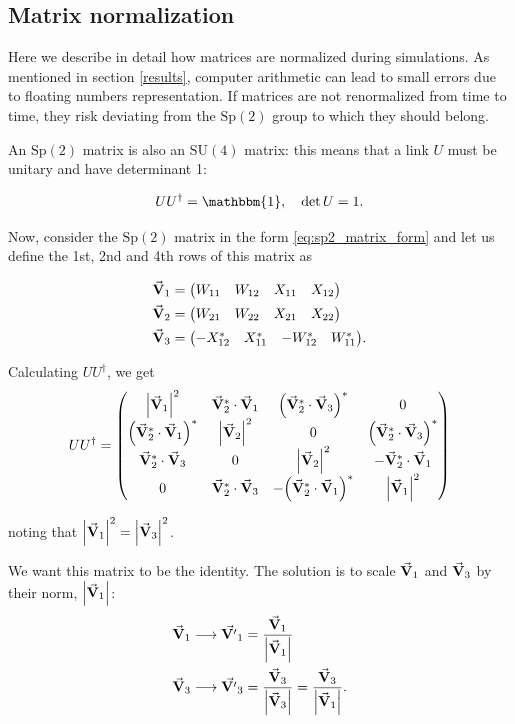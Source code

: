 \documentclass[reqno,12pt]{article}
\numberwithin{equation}{section}
\newcommand{\SU}{\mathrm{SU}}
\newcommand{\Sp}{\mathrm{Sp}}
\newcommand{\id}{\mathbbm{1}}
\begin{document}
\begin{appendices}
\section{Matrix normalization} \label{normalization}
	
Here we describe in detail how matrices are normalized during simulations. As mentioned in section \ref{results},
computer arithmetic can lead to small errors due to floating numbers representation. If matrices are not renormalized
from time to time, they risk deviating from the $\Sp(2)$ group to which they should belong. 

An $\Sp(2)$ matrix is also an $\SU(4)$ matrix: this means that a link $U$ must be unitary and have determinant 1:

\begin{equation}
	UU^\dagger = \id \qc \det U = 1.
\end{equation}	

Now, consider the $\Sp(2)$ matrix in the form \eqref{eq:sp2_matrix_form}
 and let us define the 1st, 2nd and 4th rows of this matrix as

\begin{equation}	
	\begin{aligned}
		\va{V}_1 &= \mqty(W_{11} & W_{12} & X_{11} & X_{12}) \\
		\va{V}_2 &= \mqty(W_{21} & W_{22} & X_{21} & X_{22}) \\
		\va{V}_3 &= \mqty(-X_{12}^* & X_{11}^* & -W_{12}^* & W_{11}^*).
	\end{aligned}
\end{equation}

Calculating $UU^\dagger$, we get
\begin{equation}
	UU^\dagger = 
	\mqty(
		\abs{\va{V}_1}^2 & \va{V}_2^*\cdot\va{V}_1 & \qty(\va{V}_2^*\cdot\va{V}_3)^* & 0 \\
		\qty(\va{V}_2^*\cdot\va{V}_1)^* & \abs{\va{V}_2}^2 & 0 & \qty(\va{V}_2^*\cdot\va{V}_3)^* \\
		\va{V}_2^*\cdot\va{V}_3 & 0 & \abs{\va{V}_2}^2 & -\va{V}_2^*\cdot\va{V}_1 \\
		0 & \va{V}_2^*\cdot\va{V}_3 & -\qty(\va{V}_2^*\cdot\va{V}_1)^* & \abs{\va{V}_1}^2
	)
\end{equation}

noting that $\abs{\va{V}_1}^2 = \abs{\va{V}_3}^2$.

We want this matrix to be the identity. The solution is to scale $\va{V}_1$ and $\va{V}_3$ by their norm, $\abs{\va{V}_1}$:
\begin{equation}
\begin{aligned}
\va{V}_1 &\longrightarrow \va{V'}_1 = \frac{\va{V}_1}{\abs{\va{V}_1}} \\
\va{V}_3 &\longrightarrow \va{V'}_3 = \frac{\va{V}_3}{\abs{\va{V}_3}} = \frac{\va{V}_3}{\abs{\va{V}_1}}.
\end{aligned}
\end{equation}


\end{appendices}
\end{document}
